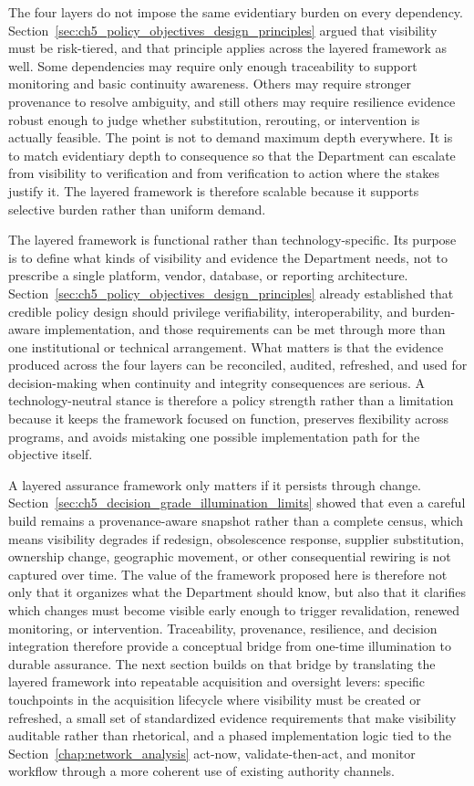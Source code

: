 The four layers do not impose the same evidentiary burden on every dependency. Section~\ref{sec:ch5_policy_objectives_design_principles} argued that visibility must be risk-tiered, and that principle applies across the layered framework as well. Some dependencies may require only enough traceability to support monitoring and basic continuity awareness. Others may require stronger provenance to resolve ambiguity, and still others may require resilience evidence robust enough to judge whether substitution, rerouting, or intervention is actually feasible. The point is not to demand maximum depth everywhere. It is to match evidentiary depth to consequence so that the Department can escalate from visibility to verification and from verification to action where the stakes justify it. The layered framework is therefore scalable because it supports selective burden rather than uniform demand.

The layered framework is functional rather than technology-specific. Its purpose is to define what kinds of visibility and evidence the Department needs, not to prescribe a single platform, vendor, database, or reporting architecture. Section~\ref{sec:ch5_policy_objectives_design_principles} already established that credible policy design should privilege verifiability, interoperability, and burden-aware implementation, and those requirements can be met through more than one institutional or technical arrangement. What matters is that the evidence produced across the four layers can be reconciled, audited, refreshed, and used for decision-making when continuity and integrity consequences are serious. A technology-neutral stance is therefore a policy strength rather than a limitation because it keeps the framework focused on function, preserves flexibility across programs, and avoids mistaking one possible implementation path for the objective itself.

A layered assurance framework only matters if it persists through change. Section~\ref{sec:ch5_decision_grade_illumination_limits} showed that even a careful build remains a provenance-aware snapshot rather than a complete census, which means visibility degrades if redesign, obsolescence response, supplier substitution, ownership change, geographic movement, or other consequential rewiring is not captured over time. The value of the framework proposed here is therefore not only that it organizes what the Department should know, but also that it clarifies which changes must become visible early enough to trigger revalidation, renewed monitoring, or intervention. Traceability, provenance, resilience, and decision integration therefore provide a conceptual bridge from one-time illumination to durable assurance. The next section builds on that bridge by translating the layered framework into repeatable acquisition and oversight levers: specific touchpoints in the acquisition lifecycle where visibility must be created or refreshed, a small set of standardized evidence requirements that make visibility auditable rather than rhetorical, and a phased implementation logic tied to the Section~\ref{chap:network_analysis} act-now, validate-then-act, and monitor workflow through a more coherent use of existing authority channels.


